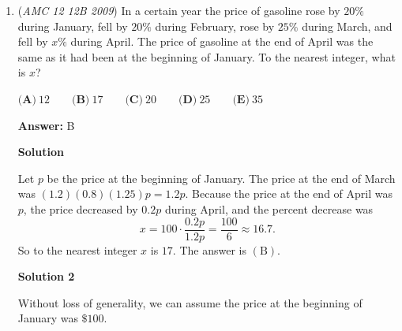 \begin{enumerate}
\textbf{Solution 2}

We use constructive counting. From $2 \times 3 + 4 \times 5$ there are four ways to place the "(". Then, there are four ways to place the ")". That accounts for 16 plausible cases.

 \textbf{Lemma:} Each value is repeated four times each. We claim the answer is 4.

 \textbf{Proof of the Lemma:}

 Very straightforward. For the single $(2) \times 3 + 4 \times 5$ obviously we see it is repeated four times. For the double, we have that $(2 \times 3) + 4 \times 5 = 2 \times 3 + (4 \times 5)$ is the same. A counting argument easily shows that if one places each of the parentheses such that it follows the Law of PEMDAS, then we obtain cases where we have a repeated sum. We handwave the rest of the proof as an interesting exercise for the reader, but the proof can be built upon PEMDAS.

 \textbf{2009 AMC 10B P7}

 The answer is $\boxed{4}$.

 


	\item (\textit{AMC 12 12B 2009}) In a certain year the price of gasoline rose by $20\%$ during January, fell by $20\%$ during February, rose by $25\%$ during March, and fell by $x\%$ during April. The price of gasoline at the end of April was the same as it had been at the beginning of January. To the nearest integer, what is $x$?


 $\textbf{(A)}\ 12\qquad \textbf{(B)}\ 17\qquad \textbf{(C)}\ 20\qquad \textbf{(D)}\ 25\qquad \textbf{(E)}\ 35$

 \textbf{Answer: }B



\textbf{Solution}

Let $p$ be the price at the beginning of January.  The price at the end of March was $(1.2)(0.8)(1.25)p = 1.2p.$ Because the price at the end of April was $p$, the price decreased by $0.2p$ during April, and the percent decrease was
 \[x = 100 \cdot \frac{0.2p}{1.2p} = \frac {100}{6} \approx 16.7.\]So to the nearest integer $x$ is $\boxed{17}$.  The answer is $\mathrm{(B)}$.

 



\textbf{Solution 2}

Without loss of generality, we can assume the price at the beginning of January was $\$100$. 


\end{enumerate}
